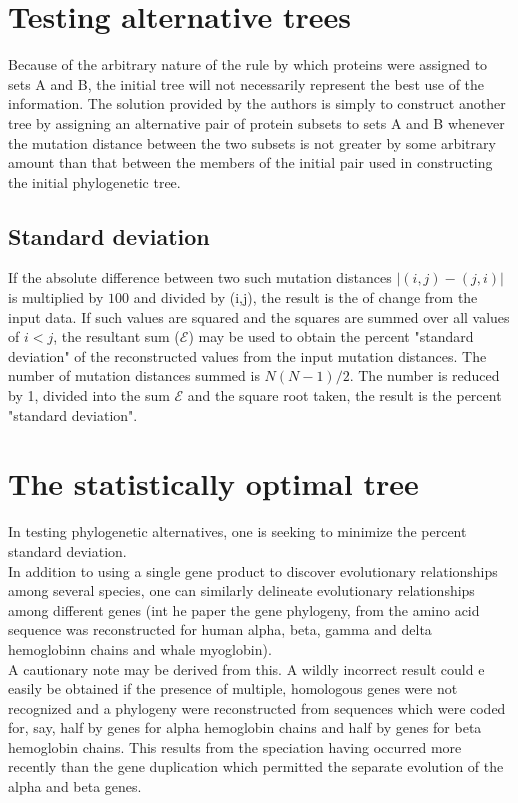 \section{Testing alternative trees}
Because of the arbitrary nature of the rule by which proteins were assigned to sets A and B, the initial tree will not necessarily represent the best use of the information. The solution provided by the authors is simply to construct another tree by assigning an alternative pair of protein subsets to sets A and B whenever the mutation distance between the two subsets is not greater by some arbitrary amount than that between the members of the initial pair used in constructing the initial phylogenetic tree.

\subsection{Standard deviation}
If the absolute difference between two such mutation distances $|(i,j)-(j,i)|$ is multiplied by $100$ and divided by (i,j), the result is the  of change from the input data. If such values are squared and the squares are summed over all values of $i < j$, the resultant sum ($\mathcal{E}$) may be used to obtain the percent "standard deviation" of the reconstructed values from the input mutation distances. The number of mutation distances summed is $N(N-1)/2$. The number is reduced by 1, divided into the sum $\mathcal{E}$ and the square root taken, the result is the percent "standard deviation".

\section{The statistically optimal tree}
In testing phylogenetic alternatives, one is seeking to minimize the percent standard deviation.
\\
In addition to using a single gene product to discover evolutionary relationships among several species, one can similarly delineate evolutionary relationships among different genes (int he paper the gene phylogeny, from the amino acid sequence was reconstructed for human alpha, beta, gamma and delta hemoglobinn chains and whale myoglobin).
\\
A cautionary note may be derived from this. A wildly incorrect result could e easily be obtained if the presence of multiple, homologous genes were not recognized and a phylogeny were reconstructed from sequences which were coded for, say, half by genes for alpha hemoglobin chains and half by genes for beta hemoglobin chains. This results from the speciation having occurred more recently than the gene duplication which permitted the separate evolution of the alpha and beta genes.

